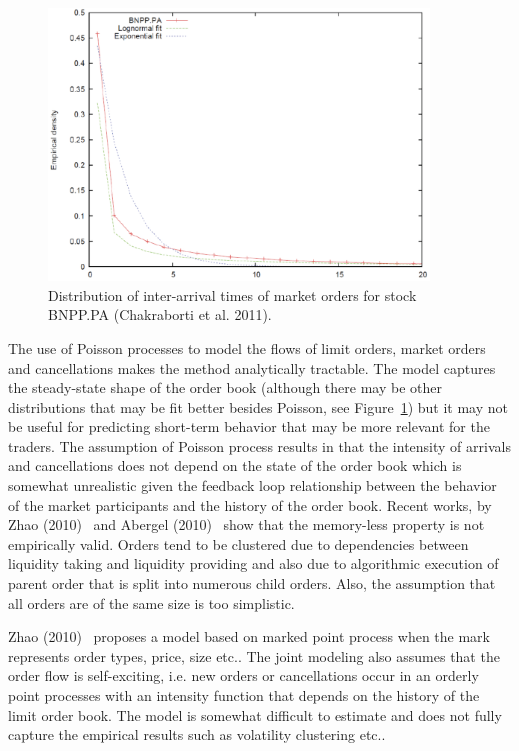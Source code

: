 	\begin{figure}[!ht]
   	\centering
   	\includegraphics[width=0.9\textwidth]{chapters/chapter_trade_data_models/figures/intertime.png} 
   	\caption{Distribution of inter-arrival times of market orders for stock BNPP.PA (Chakraborti et al. 2011). \label{fig:intertimefig}}
	\end{figure}

The use of Poisson processes to model the flows of limit orders, market orders and cancellations makes the method analytically tractable. The model captures the steady-state shape of the order book (although there may be other distributions that may be fit better besides Poisson, see Figure~\ref{fig:intertimefig}) but it may not be useful for predicting short-term behavior that may be more relevant for the traders. The assumption of Poisson process results in that the intensity of arrivals and cancellations does not depend on the state of the order book which is somewhat unrealistic given the feedback loop relationship between the behavior of the market participants and the history of the order book. Recent works, by Zhao (2010)~\cite{} and Abergel (2010)~\cite{} show that the memory-less property is not empirically valid. Orders tend to be clustered due to dependencies between liquidity taking and liquidity providing and also due to algorithmic execution of parent order that is split into numerous child orders. Also, the assumption that all orders are of the same size is too simplistic. 


Zhao (2010)~\cite{} proposes a model based on marked point process when the mark represents order types, price, size etc.. The joint modeling also assumes that the order flow is self-exciting, i.e. new orders or cancellations occur in an orderly point processes with an intensity function that depends on the history of the limit order book. The model is somewhat difficult to estimate and does not fully capture the empirical results such as volatility clustering etc.. \\

